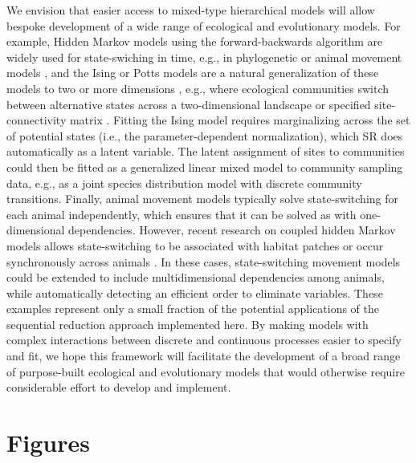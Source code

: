 \documentclass[11pt]{article}
\begin{document}
We envision that easier access to mixed-type hierarchical models will allow bespoke development of a wide range of ecological and evolutionary models.  For example, Hidden Markov models using the forward-backwards algorithm are widely used for state-swiching in time, e.g., in phylogenetic or animal movement models \citep{mcclintock_multistate_2024}, and the Ising or Potts models are a natural generalization of these models to two or more dimensions \citep{noble_emergent_2015}, e.g., where ecological communities switch between alternative states across a two-dimensional landscape or specified site-connectivity matrix \citep{hanski_metapopulation_1998}.  Fitting the Ising model requires marginalizing across the set of potential states (i.e., the parameter-dependent normalization), which SR does automatically as a latent variable.  The latent assignment of sites to communities could then be fitted as a generalized linear mixed model to community sampling data, e.g., as a joint species distribution model with discrete community transitions.  Finally, animal movement models typically solve state-switching for each animal independently, which ensures that it can be solved as with one-dimensional dependencies.  However, recent research on coupled hidden Markov models allows state-switching to be associated with habitat patches or occur synchronously across animals \citep{pohle_primer_2021}.  In these cases, state-switching movement models could be extended to include multidimensional dependencies among animals, while automatically detecting an efficient order to eliminate variables. These examples represent only a small fraction of the potential applications of the sequential reduction approach implemented here. By making models with complex interactions between discrete and continuous processes easier to specify and fit, we hope this framework will facilitate the development of a broad range of purpose-built ecological and evolutionary models that would otherwise require considerable effort to develop and implement.



\clearpage

\section{Figures}
\end{document}
